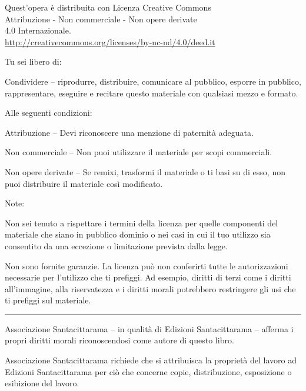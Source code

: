 \clearpage
\thispagestyle{plain}
\vspace*{-4\baselineskip}

{\copyrightsize\setlength{\parindent}{0pt}%
\raggedright\label{copyright-details}
\setlength{\parskip}{8pt}
{\centering

{\large\ccbyncnd}

Quest'opera è distribuita con Licenza Creative Commons\\
Attribuzione - Non commerciale - Non opere derivate\\
4.0 Internazionale.\\
\href{http://creativecommons.org/licenses/by-nc-nd/4.0/deed.it}{http://creativecommons.org/licenses/by-nc-nd/4.0/deed.it}

}

Tu sei libero di:
\begin{packeditemize}
  \item Condividere -- riprodurre, distribuire, comunicare al pubblico, esporre in pubblico, rappresentare, eseguire e recitare questo materiale con qualsiasi mezzo e formato.
\end{packeditemize}

Alle seguenti condizioni:

\begin{packeditemize}
\item Attribuzione -- Devi riconoscere una menzione di paternità adeguata.
\item Non commerciale -- Non puoi utilizzare il materiale per scopi commerciali.
\item Non opere derivate -- Se remixi, trasformi il materiale o ti basi su di esso, non puoi distribuire il materiale così modificato.
\end{packeditemize}

Note:

Non sei tenuto a rispettare i termini della licenza per quelle componenti del
materiale che siano in pubblico dominio o nei casi in cui il tuo utilizzo sia
consentito da una eccezione o limitazione prevista dalla legge.

Non sono fornite garanzie. La licenza può non conferirti tutte le autorizzazioni
necessarie per l'utilizzo che ti prefiggi. Ad esempio, diritti di terzi come i
diritti all'immagine, alla riservatezza e i diritti morali potrebbero
restringere gli usi che ti prefiggi sul materiale.

{\centering
  \color[gray]{0.4}\rule{0.4\linewidth}{0.1pt}%
\par}

Associazione Santacittarama -- in qualità di Edizioni Santacittarama -- afferma
i propri diritti morali riconoscendosi come autore di questo libro.

Associazione Santacittarama richiede che si attribuisca la proprietà del lavoro
ad Edizioni Santacittarama per ciò che concerne copie, distribuzione,
esposizione o esibizione del lavoro.

}
